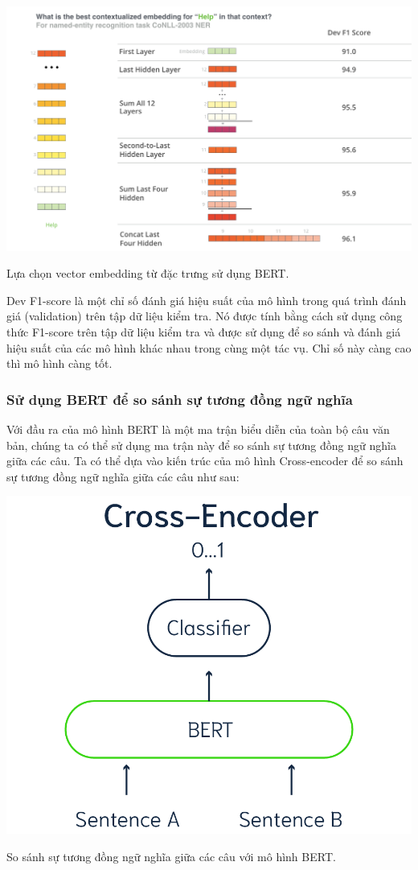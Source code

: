 \documentclass[a4paper, 12pt, openany]{book}
\begin{document}
\begin{minipage}{\linewidth}
    \captionsetup{type=figure}
    \centering
    \includegraphics[width=.8\linewidth]{./assets/images/BERT-context2.png}
    \caption{Lựa chọn vector embedding từ đặc trưng sử dụng BERT.}
    \label{fig:bert_context2}
\end{minipage}
\vspace{0.5cm}

Dev F1-score là một chỉ số đánh giá hiệu suất của mô hình trong quá trình đánh giá (validation) trên tập dữ liệu kiểm
tra. Nó được tính bằng cách sử dụng công thức F1-score trên tập dữ liệu kiểm tra và được sử dụng để so sánh và đánh
giá hiệu suất của các mô hình khác nhau trong cùng một tác vụ. Chỉ số này càng cao thì mô hình càng tốt.

\subsubsection{Sử dụng BERT để so sánh sự tương đồng ngữ nghĩa}

Với đầu ra của mô hình BERT là một ma trận biểu diễn của toàn bộ câu văn bản, chúng ta có thể sử dụng ma trận này để so sánh sự tương đồng ngữ nghĩa giữa các câu.
Ta có thể dựa vào kiến trúc của mô hình Cross-encoder để so sánh sự tương đồng ngữ nghĩa giữa các câu như sau:

\begin{minipage}{\linewidth}
    \captionsetup{type=figure}
    \centering
    \includegraphics[width=.8\linewidth]{./assets/images/cross-encoder.png}
    \caption{So sánh sự tương đồng ngữ nghĩa giữa các câu với mô hình BERT.}
\end{minipage}
\vspace{0.5cm}
\end{document}
